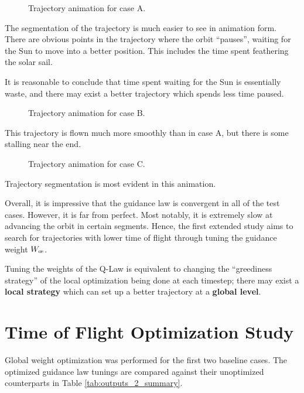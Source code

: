 \begin{figure}[H]
    \caption{Trajectory animation for case A.}
    \label{fig:anim_a}
\end{figure}
The segmentation of the trajectory is much easier to see in animation form. There are obvious points in the trajectory where the orbit ``pauses'', waiting for the Sun to move into a better position. This includes the time spent feathering the solar sail.

It is reasonable to conclude that time spent waiting for the Sun is essentially waste, and there may exist a better trajectory which spends less time paused.
\begin{figure}[H]
    \caption{Trajectory animation for case B.}
    \label{fig:anim_b}
\end{figure}

This trajectory is flown much more smoothly than in case A, but there is some stalling near the end.

\begin{figure}[H]
    \caption{Trajectory animation for case C.}
    \label{fig:anim_c}
\end{figure}
Trajectory segmentation is most evident in this animation.

Overall, it is impressive that the guidance law is convergent in all of the test cases. However, it is far from perfect. Most notably, it is extremely slow at advancing the orbit in certain segments. Hence, the first extended study aims to search for trajectories with lower time of flight through tuning the guidance weight \(W_{\moe}\).

Tuning the weights of the Q-Law is equivalent to changing the ``greediness strategy'' of the local optimization being done at each timestep; there may exist a \textbf{local strategy} which can set up a better trajectory at a \textbf{global level}.


\newpage
\section{Time of Flight Optimization Study}
Global weight optimization was performed for the first two baseline cases. The optimized guidance law tunings are compared against their unoptimized counterparts in Table \ref{tab:outputs_2_summary}.

